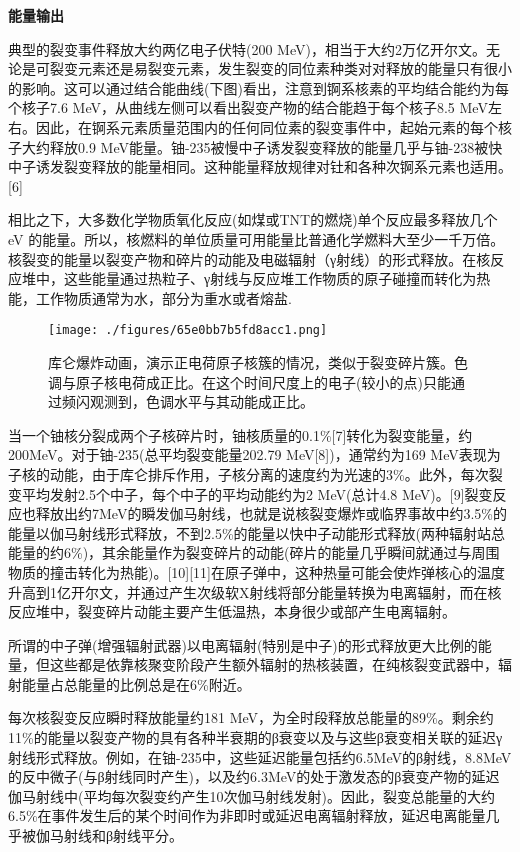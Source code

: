 \textbf{能量输出}

典型的裂变事件释放大约两亿电子伏特(200 MeV)，相当于大约2万亿开尔文。无论是可裂变元素还是易裂变元素，发生裂变的同位素种类对对释放的能量只有很小的影响。这可以通过结合能曲线(下图)看出，注意到锕系核素的平均结合能约为每个核子7.6 MeV，从曲线左侧可以看出裂变产物的结合能趋于每个核子8.5 MeV左右。因此，在锕系元素质量范围内的任何同位素的裂变事件中，起始元素的每个核子大约释放0.9 MeV能量。铀-235被慢中子诱发裂变释放的能量几乎与铀-238被快中子诱发裂变释放的能量相同。这种能量释放规律对钍和各种次锕系元素也适用。[6]

相比之下，大多数化学物质氧化反应(如煤或TNT的燃烧)单个反应最多释放几个eV 的能量。所以，核燃料的单位质量可用能量比普通化学燃料大至少一千万倍。核裂变的能量以裂变产物和碎片的动能及电磁辐射（γ射线）的形式释放。在核反应堆中，这些能量通过热粒子、γ射线与反应堆工作物质的原子碰撞而转化为热能，工作物质通常为水，部分为重水或者熔盐.
\begin{figure}[ht]
\centering
\texttt{[image: ./figures/65e0bb7b5fd8acc1.png]}
\caption{库仑爆炸动画，演示正电荷原子核簇的情况，类似于裂变碎片簇。色调与原子核电荷成正比。在这个时间尺度上的电子(较小的点)只能通过频闪观测到，色调水平与其动能成正比。} \label{fig_HLB_4}
\end{figure}
当一个铀核分裂成两个子核碎片时，铀核质量的0.1\%[7]转化为裂变能量，约200MeV。对于铀-235(总平均裂变能量202.79 MeV[8])，通常约为169 MeV表现为子核的动能，由于库仑排斥作用，子核分离的速度约为光速的3\%。此外，每次裂变平均发射2.5个中子，每个中子的平均动能约为2 MeV(总计4.8 MeV)。[9]裂变反应也释放出约7MeV的瞬发伽马射线，也就是说核裂变爆炸或临界事故中约3.5\%的能量以伽马射线形式释放，不到2.5\%的能量以快中子动能形式释放(两种辐射站总能量的约6\%)，其余能量作为裂变碎片的动能(碎片的能量几乎瞬间就通过与周围物质的撞击转化为热能)。[10][11]在原子弹中，这种热量可能会使炸弹核心的温度升高到1亿开尔文，并通过产生次级软X射线将部分能量转换为电离辐射，而在核反应堆中，裂变碎片动能主要产生低温热，本身很少或部产生电离辐射。

所谓的中子弹(增强辐射武器)以电离辐射(特别是中子)的形式释放更大比例的能量，但这些都是依靠核聚变阶段产生额外辐射的热核装置，在纯核裂变武器中，辐射能量占总能量的比例总是在6\%附近。

每次核裂变反应瞬时释放能量约181 MeV，为全时段释放总能量的89\%。剩余约11\%的能量以裂变产物的具有各种半衰期的β衰变以及与这些β衰变相关联的延迟γ射线形式释放。例如，在铀-235中，这些延迟能量包括约6.5MeV的β射线，8.8MeV的反中微子(与β射线同时产生)，以及约6.3MeV的处于激发态的β衰变产物的延迟伽马射线中(平均每次裂变约产生10次伽马射线发射)。因此，裂变总能量的大约6.5\%在事件发生后的某个时间作为非即时或延迟电离辐射释放，延迟电离能量几乎被伽马射线和β射线平分。

